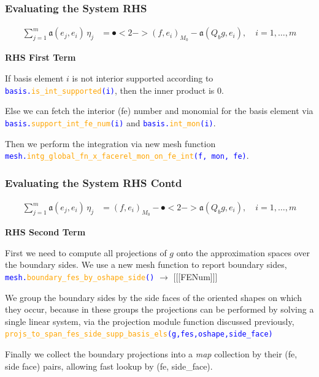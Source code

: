 \documentclass[compress]{beamer}
\begin{document}
\begin{frame}
  \frametitle{Evaluating the System RHS}
  \vspace{-1.15cm}
  \begin{align*}
    \sum_{j=1}^m{\mathfrak{a}(e_j, e_i) \,\eta_j} &= \spot<2->{(f, e_i)_{M_0}} - \mathfrak{a}(Q_b g, e_i), \quad i=1,\dots,m
  \end{align*}
  
  \pause
  \uncover<+-> {
  \textbf{RHS First Term}
  \vspace{.3cm}

  \uncover<+-> {
  If basis element $i$ is not interior supported according to 
  {\small \texttt{\textcolor{blue}{basis.\textcolor{orange}{is\_int\_supported}(i)}}}, then the inner product is 0.\\
  
  \uncover<+-> {
  \vspace{.3cm}
  Else we can fetch the interior (fe) number and monomial for the basis element via
  {\small \texttt{\textcolor{blue}{basis.\textcolor{orange}{support\_int\_fe\_num}(i)}}}
  and {\small \texttt{\textcolor{blue}{basis.\textcolor{orange}{int\_mon}(i)}}}.
  
  \uncover<+-> {
  \vspace{.3cm}
  Then we perform the integration via new mesh function\\
  {\small \texttt{\textcolor{blue}{mesh.\textcolor{orange}{intg\_global\_fn\_x\_facerel\_mon\_on\_fe\_int}(f, mon, fe)}}}.
  }}}}
\end{frame}

\begin{frame}
  \frametitle{Evaluating the System RHS Contd}
  \vspace{-.29cm}
  \begin{align*}
    \sum_{j=1}^m{\mathfrak{a}(e_j, e_i) \,\eta_j} &= (f, e_i)_{M_0} - \spot<2->{\mathfrak{a}(Q_b g, e_i)}, \quad i=1,\dots,m
  \end{align*}
  
  \pause
  \uncover<+-> {
  \textbf{RHS Second Term}

  \vspace{.2cm}
  First we need to compute all projections of $g$ onto the approximation spaces over the boundary sides.
  We use a new mesh function to report boundary sides,
  {\small \texttt{\textcolor{blue}{mesh.\textcolor{orange}{boundary\_fes\_by\_oshape\_side}()}} $\rightarrow$ [[[FENum]]]}

  \uncover<+-> {
    We group the boundary sides by the side faces of the oriented shapes on which they occur, because in these groups the projections
    can be performed by solving a single linear system, via the projection module function discussed previously,\\
    {\small \texttt{\textcolor{blue}{\textcolor{orange}{projs\_to\_span\_fes\_side\_supp\_basis\_els}({\small{g,fes,oshape,side\_face}})}}}

  \uncover<+-> {
  \vspace{.1cm}
  Finally we collect the boundary projections into a \emph{map} collection by their (fe, side face) pairs, 
  allowing fast lookup by (fe, side\_face).
  }}}
\end{frame}
\end{document}
